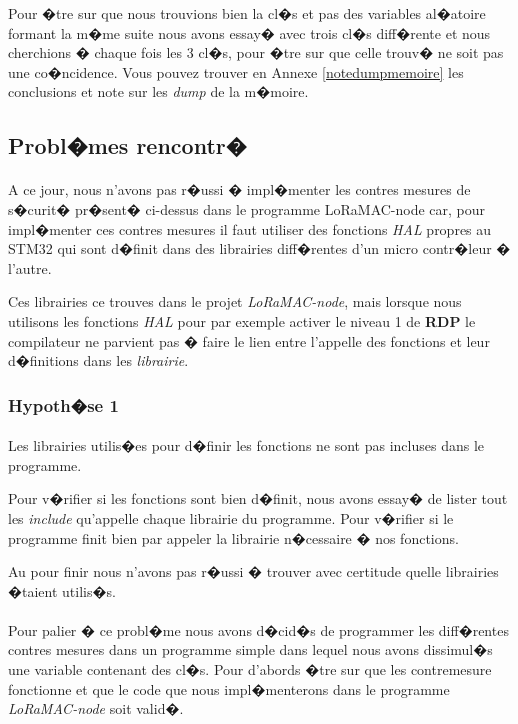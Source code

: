 \documentclass[a4paper, titlepage,12pt]{report}
\begin{document}
Pour �tre sur que nous trouvions bien la cl�s et pas des variables al�atoire formant la m�me suite nous avons essay� avec trois cl�s diff�rente et nous cherchions � chaque fois les 3 cl�s, pour �tre sur que celle trouv� ne soit pas une co�ncidence. Vous pouvez trouver en Annexe \ref{notedumpmemoire} les conclusions et note sur les \textit{dump} de la m�moire.
\pagebreak

\subsection{Probl�mes rencontr�}
\paragraph{}
A ce jour, nous n'avons pas r�ussi � impl�menter les contres mesures de s�curit� pr�sent� ci-dessus dans le programme LoRaMAC-node car, pour impl�menter ces contres mesures il faut utiliser des fonctions \textit{HAL} propres au STM32 qui sont d�finit dans des librairies diff�rentes d'un micro contr�leur � l'autre.

Ces librairies ce trouves dans le projet \textit{LoRaMAC-node}, mais lorsque nous utilisons les fonctions \textit{HAL} pour par exemple activer le niveau 1 de \textbf{RDP} le compilateur ne parvient pas � faire le lien entre l'appelle des fonctions et leur d�finitions dans les \textit{librairie}.

\subsubsection{Hypoth�se 1}
\paragraph{}
Les librairies utilis�es pour d�finir les fonctions ne sont pas incluses dans le programme. 

Pour v�rifier si les fonctions sont bien d�finit, nous avons essay� de lister tout les \textit{include} qu'appelle chaque librairie du programme. Pour v�rifier si le programme finit bien par appeler la librairie n�cessaire � nos fonctions.

Au pour finir nous n'avons pas r�ussi � trouver avec certitude quelle librairies �taient utilis�s.

\paragraph{}
Pour palier � ce probl�me nous avons d�cid�s de programmer les diff�rentes contres mesures dans un programme simple dans lequel nous avons dissimul�s une variable contenant des cl�s. Pour d'abords �tre sur que les contremesure fonctionne et que le code que nous impl�menterons dans le programme \textit{LoRaMAC-node} soit valid�.
\end{document}

